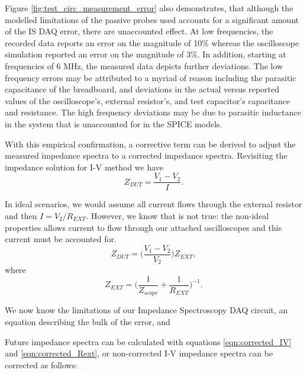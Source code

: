 \par Figure \ref{fig:test_circ_measurement_error} also demonstrates, that although the modelled limitations of the passive probes used accounts for a significant amount of the IS DAQ error, there are unaccounted effect. At low frequencies, the recorded data reports an error on the magnitude of 10\% whereas the oscilloscope simulation reported an error on the magnitude of 3\%. In addition, starting at frequencies of 6 MHz, the measured data depicts further deviations. The low frequency errors may be attributed to a myriad of reason including the parasitic capacitance of the breadboard, and deviations in the actual versus reported values of the oscilloscope's, external resistor's, and test capacitor's capacitance and resistance. The high frequency deviations may be due to parasitic inductance in the system that is unaccounted for in the SPICE models.

\par With this empirical confirmation, a corrective term can be derived to adjust the measured impedance spectra to a corrected impedance spectra. Revisiting the impedance solution for I-V method we have 
\begin{equation}
    Z_{DUT} = \frac{V_1 - V_2}{I}.
\end{equation}

\par In ideal scenarios, we would assume all current flows through the external resistor and then $I = V_2 / R_{EXT}$. However, we know that is not true: the non-ideal properties allows current to flow through our attached oscilloscopes and this current must be accounted for. 
\begin{equation}
    Z_{DUT} = \bigg(\frac{V_1 - V_2}{V_2}\bigg)Z_{EXT},
    \label{eqn:corrected_IV}
\end{equation}
\noindent where
\begin{equation}
    Z_{EXT} = \bigg(\frac{1}{Z_{scope}}+\frac{1}{R_{EXT}}\bigg)^{-1}.
    \label{eqn:corrected_Rext}
\end{equation}

\par We now know the limitations of our Impedance Spectroscopy DAQ circuit, an equation describing the bulk of the error, and

\par Future impedance spectra can be calculated with equations \ref{eqn:corrected_IV} and \ref{eqn:corrected_Rext}, or non-corrected I-V impedance spectra can be corrected as follows:

